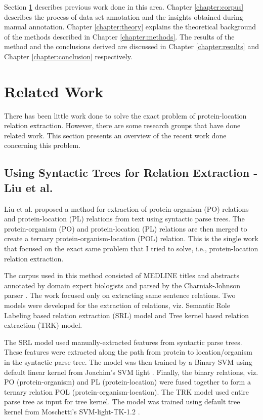 Section \ref{sec:existingWork} describes previous work done in this area. Chapter \ref{chapter:corpus} describes the process of data set annotation and the insights obtained during manual annotation. Chapter \ref{chapter:theory} explains the theoretical background of the methods described in Chapter \ref{chapter:methods}. The results of the method and the conclusions derived are discussed in Chapter \ref{chapter:results} and Chapter \ref{chapter:conclusion} respectively.

\section{Related Work}\label{sec:existingWork}

There has been little work done to solve the exact problem of protein-location relation extraction. However, there are some research groups that have done related work. This section presents an overview of the recent work done concerning this problem.

\subsection{Using Syntactic Trees for Relation Extraction - Liu et al.}

Liu et al. \cite{liu2007exploiting} proposed a method for extraction of protein-organism (PO) relations and protein-location (PL) relations from text using syntactic parse trees. The protein-organism (PO) and protein-location (PL) relations are then merged to create a ternary protein-organism-location (POL) relation. This is the single work that focused on the exact same problem that I tried to solve, i.e., protein-location relation extraction.

The corpus used in this method consisted of MEDLINE titles and abstracts annotated by domain expert biologists and parsed by the Charniak-Johnson parser \cite{charniak2006multilevel}. The work focused only on extracting same sentence relations. Two models were developed for the extraction of relations, viz. Semantic Role Labeling based relation extraction (SRL) model and Tree kernel based relation extraction (TRK) model. 

The SRL model used manually-extracted features from syntactic parse trees. These features were extracted along the path from protein to location/organism in the syntactic parse tree. The model was then trained by a Binary SVM using default linear kernel from Joachim’s SVM light \cite{joachims1999making}. Finally, the binary relations, viz. PO (protein-organism) and PL (protein-location) were fused together to form a ternary relation POL (protein-organism-location). The TRK model used entire parse tree as input for tree kernel. The model was trained using default tree kernel from Moschetti’s SVM-light-TK-1.2 \cite{moschitti2004study}. 

